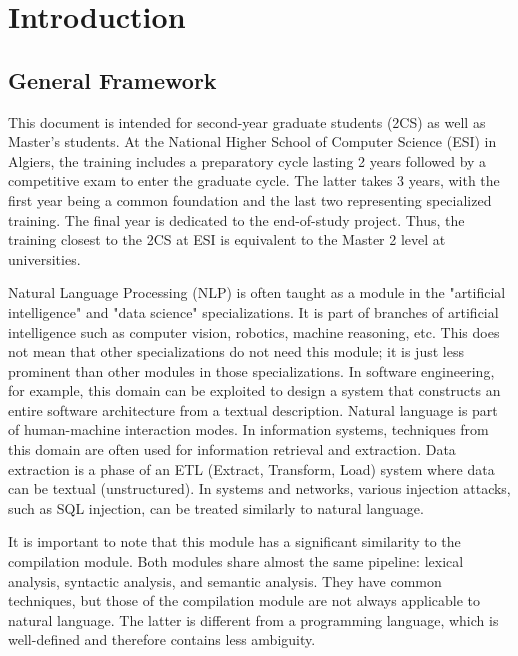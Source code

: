 \documentclass{KBook}
\begin{document}
\mainmatter

\fi

\chapter*{Introduction}

\section*{General Framework}

This document is intended for second-year graduate students (2CS) as well as Master's students.
At the National Higher School of Computer Science (ESI) in Algiers, the training includes a preparatory cycle lasting
2 years followed by a competitive exam to enter the graduate cycle.
The latter takes 3 years, with the first year being a common foundation and the last two representing specialized training.
The final year is dedicated to the end-of-study project.
Thus, the training closest to the 2CS at ESI is equivalent to the Master 2 level at universities.

Natural Language Processing (NLP) is often taught as a module in the "artificial intelligence" and "data science" specializations.
It is part of branches of artificial intelligence such as computer vision, robotics, machine reasoning, etc.
This does not mean that other specializations do not need this module; it is just less prominent than other modules in those specializations.
In software engineering, for example, this domain can be exploited to design a system that constructs an entire software architecture from a textual description.
Natural language is part of human-machine interaction modes.
In information systems, techniques from this domain are often used for information retrieval and extraction.
Data extraction is a phase of an ETL (Extract, Transform, Load) system where data can be textual (unstructured).
In systems and networks, various injection attacks, such as SQL injection, can be treated similarly to natural language.

It is important to note that this module has a significant similarity to the compilation module.
Both modules share almost the same pipeline: lexical analysis, syntactic analysis, and semantic analysis.
They have common techniques, but those of the compilation module are not always applicable to natural language.
The latter is different from a programming language, which is well-defined and therefore contains less ambiguity.
\end{document}
